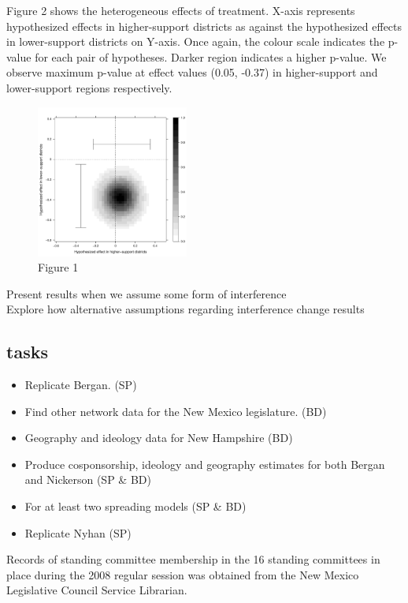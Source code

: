 \documentclass[12pt]{article}
\begin{document}
Figure 2 shows the heterogeneous effects of treatment. X-axis represents hypothesized effects in higher-support districts as against the hypothesized effects in lower-support districts on Y-axis. Once again, the colour scale indicates the p-value for each pair of hypotheses. Darker region indicates a higher p-value. We observe maximum p-value at effect values (0.05, -0.37) in higher-support and lower-support regions respectively.


\begin{figure}[H]
\centering
\includegraphics[height=5cm]{images/CoppockJEPS_figure1b.pdf}
\caption{Figure 1}
\end{figure}



Present results when we assume some form of interference \\
Explore how alternative assumptions regarding interference change results



\subsection{tasks}
\begin{itemize}
\item Replicate Bergan. (SP)
\item Find other network data for the New Mexico legislature. (BD)
\item Geography and ideology data for New Hampshire (BD)
\item Produce cosponsorship, ideology and geography estimates for both Bergan and Nickerson (SP \& BD)
\item For at least two spreading models (SP \& BD)
\item Replicate Nyhan (SP)
\end{itemize}


Records of standing committee membership in the 16 standing committees in place during the 2008 regular session was obtained from the New Mexico Legislative Council Service Librarian. 
\end{document}
